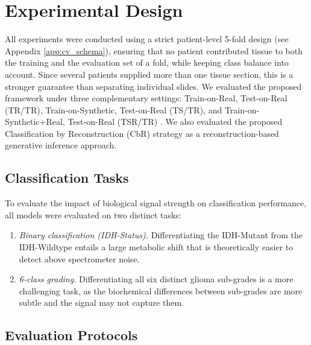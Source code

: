 \chapter{Experimental Design}
\label{sec:experimental_design}

All experiments were conducted using a strict patient-level 5-fold design (see Appendix \ref{app:cv_schema}), ensuring that no patient contributed tissue to both the training and the evaluation set of a fold, while keeping class balance into account. Since several patients supplied more than one tissue section, this is a stronger guarantee than separating individual slides. We evaluated the proposed framework under three complementary settings: Train-on-Real, Test-on-Real (TR/TR), Train-on-Synthetic, Test-on-Real (TS/TR), and Train-on-Synthetic+Real, Test-on-Real (TSR/TR) \cite{esteban2017real}. We also evaluated the proposed Classification by Reconstruction (CbR) strategy as a reconstruction-based generative inference approach.

\section{Classification Tasks}

To evaluate the impact of biological signal strength on classification performance, all models were evaluated on two distinct tasks:
\begin{enumerate}
    \item \emph{Binary classification (IDH-Status).} Differentiating the IDH-Mutant from the IDH-Wildtype entails a large metabolic shift that is theoretically easier to detect above spectrometer noise.
    \item \emph{6-class grading.} Differentiating all six distinct glioma sub-grades is a more challenging task, as the biochemical differences between sub-grades are more subtle and the signal may not capture them.
\end{enumerate}

\section{Evaluation Protocols}
